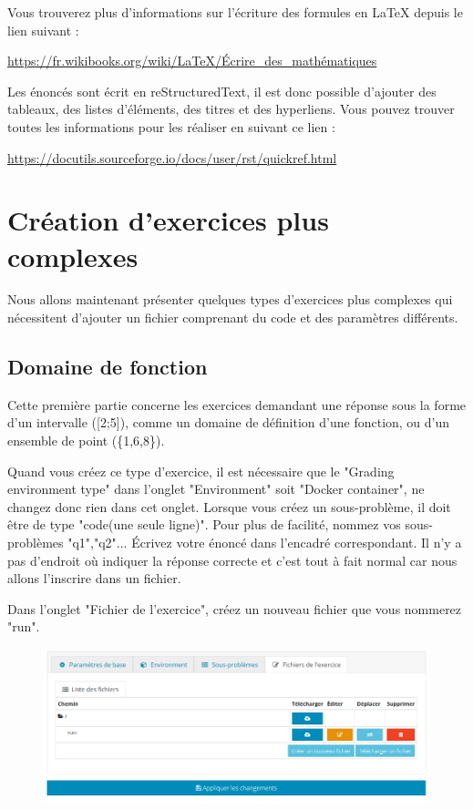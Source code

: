 \documentclass{article}
\begin{document}
Vous trouverez plus d'informations sur l'écriture des formules en LaTeX depuis le lien suivant :
\bigskip

\url{https://fr.wikibooks.org/wiki/LaTeX/Écrire_des_mathématiques}

\bigskip

Les énoncés sont écrit en reStructuredText, il est donc possible d'ajouter des tableaux, des listes d'éléments, des titres et des hyperliens. Vous pouvez trouver toutes les informations pour les réaliser en suivant ce lien :

\bigskip
\url{https://docutils.sourceforge.io/docs/user/rst/quickref.html}

\section{Création d'exercices plus complexes}

Nous allons maintenant présenter quelques types d'exercices plus complexes qui nécessitent d'ajouter un fichier comprenant du code et des paramètres différents.

\subsection{Domaine de fonction} \label{dom fct}

Cette première partie concerne les exercices demandant une réponse sous la forme d'un intervalle ([2;5]), comme un domaine de définition d'une fonction, ou d'un ensemble de point (\{1,6,8\}).
\bigskip

Quand vous créez ce type d'exercice, il est nécessaire que le "Grading environment type" dans l'onglet "Environment" soit "Docker container", ne changez donc rien dans cet onglet.
Lorsque vous créez un sous-problème, il doit être de type "code(une seule ligne)". Pour plus de facilité, nommez vos sous-problèmes "q1","q2"... Écrivez votre énoncé dans l'encadré correspondant. Il n'y a pas d'endroit où indiquer la réponse correcte et c'est tout à fait normal car nous allons l'inscrire dans un fichier.
\bigskip

Dans l'onglet "Fichier de l'exercice", créez un nouveau fichier que vous nommerez "run". 

\begin{figure}[!htb]
    \centering
    \includegraphics[scale=0.5]{images/fichier.png}
\end{figure}
\end{document}
